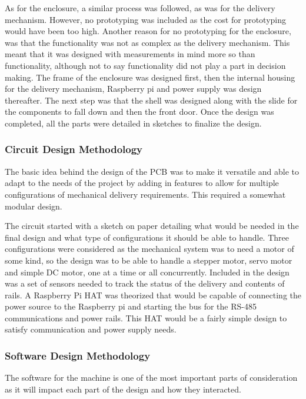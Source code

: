 \documentclass[a4paper,11pt]{article}
\numberwithin{figure}{section}
\numberwithin{table}{section}
\begin{document}
As for the enclosure, a similar process was followed, as was for the delivery mechanism. However, no prototyping was included as the cost for prototyping would have been too high. Another reason for no prototyping for the enclosure, was that the functionality was not as complex as the delivery mechanism. This meant that it was designed with measurements in mind more so than functionality, although not to say functionality did not play a part in decision making. The frame of the enclosure was designed first, then the internal housing for the delivery mechanism, Raspberry pi and power supply was design thereafter. The next step was that the shell was designed along with the slide for the components to fall down and then the front door. Once the design was completed, all the parts were detailed in sketches to finalize the design.

\subsubsection{Circuit Design Methodology}
The basic idea behind the design of the PCB was to make it versatile and able to adapt to the needs of the project by adding in features to allow for multiple configurations of mechanical delivery requirements. This required a somewhat modular design.

The circuit started with a sketch on paper detailing what would be needed in the final design and what type of configurations it should be able to handle. Three configurations were considered as the mechanical system was to need a motor of some kind, so the design was to be able to handle a stepper motor, servo motor and simple DC motor, one at a time or all concurrently. Included in the design was a set of sensors needed to track the status of the delivery and contents of rails.
A Raspberry Pi HAT was theorized that would be capable of connecting the power source to the Raspberry pi and starting the bus for the RS-485 communications and power rails. This HAT would be a fairly simple design to satisfy communication and power supply needs.



\subsubsection{Software Design Methodology}
The software for the machine is one of the most important parts of consideration as it will impact each part of the design and how they interacted.
\end{document}
